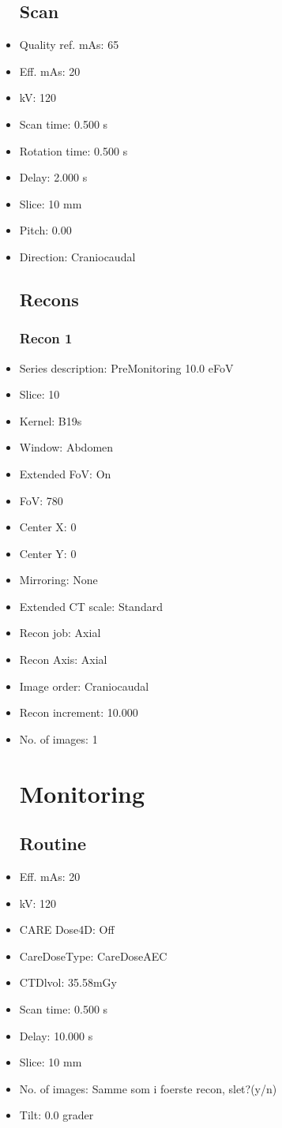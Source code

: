\documentclass[12pt]{article}
\begin{document}
\begin{itemize}
\subsection{Scan}
\item Quality ref. mAs: 65\item Eff. mAs: 20\item kV: 120\item Scan time: 0.500 s\item Rotation time: 0.500 s\item Delay: 2.000 s\item Slice: 10 mm\item Pitch: 0.00\item Direction: Craniocaudal\subsection{Recons}

\subsubsection{Recon 1}
\item Series description: PreMonitoring 10.0 eFoV
\item Slice: 10
\item Kernel: B19s
\item Window: Abdomen
\item Extended FoV: On
\item FoV: 780
\item Center X: 0
\item Center Y: 0
\item Mirroring: None
\item Extended CT scale: Standard
\item Recon job: Axial
\item Recon Axis: Axial
\item Image order: Craniocaudal
\item Recon increment: 10.000
\item No. of images: 1
\section{Monitoring}
\subsection{Routine}
\item Eff. mAs: 20\item kV: 120\item CARE Dose4D: Off\item CareDoseType: CareDoseAEC\item CTDlvol: 35.58mGy\item Scan time: 0.500 s\item Delay: 10.000 s\item Slice: 10 mm\item No. of images: Samme som i foerste recon, slet?(y/n)\item Tilt: 0.0 grader

\end{itemize}
\end{document}
